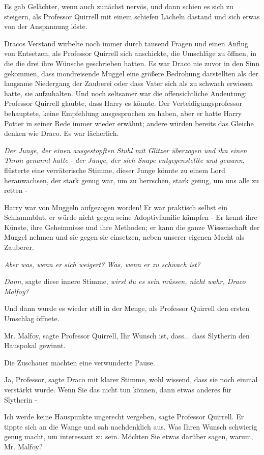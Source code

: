 Es gab Gelächter, wenn auch zunächst nervös, und dann schien es sich zu
steigern, als Professor Quirrell mit einem schiefen Lächeln dastand und sich
etwas von der Anspannung löste.

Dracos Verstand wirbelte noch immer durch tausend Fragen und einen Anflug von
Entsetzen, als Professor Quirrell sich anschickte, die Umschläge zu öffnen, in
die die drei ihre Wünsche geschrieben hatten. Es war Draco nie zuvor in den Sinn
gekommen, dass mondreisende Muggel eine größere Bedrohung darstellten als der
langsame Niedergang der Zauberei oder dass Vater sich als zu schwach erwiesen
hatte, sie aufzuhalten. Und noch seltsamer war die offensichtliche Andeutung:
Professor Quirrell glaubte, dass Harry es könnte. Der Verteidigungsprofessor
behauptete, keine Empfehlung ausgesprochen zu haben, aber er hatte Harry Potter
in seiner Rede immer wieder erwähnt; andere würden bereits das Gleiche denken
wie Draco. Es war lächerlich.

\emph{Der Junge, der einen ausgestopften Stuhl mit Glitzer überzogen und ihn
einen Thron genannt hatte} -\emph{ der Junge, der sich Snape entgegenstellte und
gewann}, flüsterte eine verräterische Stimme, dieser Junge könnte zu einem Lord
heranwachsen, der stark genug war, um zu herrschen, stark genug, um uns alle zu
retten -

Harry war von Muggeln aufgezogen worden! Er war praktisch selbst ein
Schlammblut, er würde nicht gegen seine Adoptivfamilie kämpfen - Er kennt ihre
Künste, ihre Geheimnisse und ihre Methoden; er kann die ganze Wissenschaft der
Muggel nehmen und sie gegen sie einsetzen, neben unserer eigenen Macht als
Zauberer.

\emph{Aber was, wenn er sich weigert? Was, wenn er zu schwach ist?}

\emph{Dann}, sagte diese innere Stimme, \emph{wirst du es sein müssen, nicht
wahr, Draco Malfoy?}

Und dann wurde es wieder still in der Menge, als Professor Quirrell den ersten
Umschlag öffnete.

\glqq{}Mr. Malfoy\grqq{}, sagte Professor Quirrell, \glqq{}Ihr Wunsch ist, dass...
dass Slytherin den Hauspokal gewinnt.\grqq{}

Die Zuschauer machten eine verwunderte Pause.

\glqq{}Ja, Professor\grqq{}, sagte Draco mit klarer Stimme, wohl wissend, dass
sie noch einmal verstärkt wurde. \glqq{}Wenn Sie das nicht tun können, dann etwas
anderes für Slytherin -\grqq{}

\glqq{}Ich werde keine Hauspunkte ungerecht vergeben\grqq{}, sagte Professor
Quirrell. Er tippte sich an die Wange und sah nachdenklich aus. \glqq{}Was Ihren
Wunsch schwierig genug macht, um interessant zu sein. Möchten Sie etwas darüber
sagen, warum, Mr. Malfoy?\grqq{}

